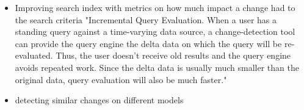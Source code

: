 
\begin{itemize}
	\item Improving search index with metrics on how much impact a change had to the search criteria
		\subitem "Incremental Query Evaluation. When a user has a standing query against a time-varying data source, a change-detection tool can provide the query engine the delta data on which the query will be re-evaluated. Thus, the user doesn’t receive old results and the query engine avoids repeated work. Since the delta data is usually much smaller than the original data, query evaluation will also be much faster." \citep{Wang2003}
	\item detecting similar changes on different models
\end{itemize}
